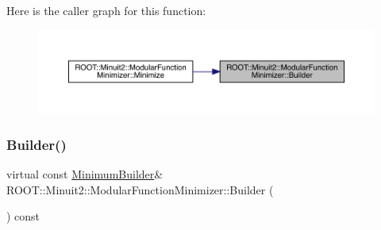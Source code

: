 Here is the caller graph for this function\+:
\nopagebreak
\begin{figure}[H]
\begin{center}
\leavevmode
\includegraphics[width=350pt]{d3/dc8/classROOT_1_1Minuit2_1_1ModularFunctionMinimizer_a13e98551cf14e927c61e1e34ecf8ba8b_icgraph}
\end{center}
\end{figure}
\mbox{\label{classROOT_1_1Minuit2_1_1ModularFunctionMinimizer_a13e98551cf14e927c61e1e34ecf8ba8b}} 
\subsubsection{\texorpdfstring{Builder()}{Builder()}\hspace{0.1cm}{\footnotesize\ttfamily [2/3]}}
{\footnotesize\ttfamily virtual const \mbox{\hyperlink{classROOT_1_1Minuit2_1_1MinimumBuilder}{Minimum\+Builder}}\& R\+O\+O\+T\+::\+Minuit2\+::\+Modular\+Function\+Minimizer\+::\+Builder (\begin{DoxyParamCaption}{ }\end{DoxyParamCaption}) const\hspace{0.3cm}{\ttfamily [pure virtual]}}



